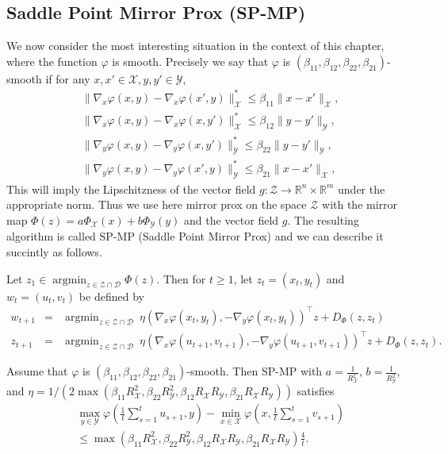 \documentclass[openany]{now}
\renewcommand{\phi}{\varphi}
\newcommand{\R}{\mathbb{R}}
\newcommand{\cZ}{\mathcal{Z}}
\newcommand{\cX}{\mathcal{X}}
\newcommand{\cY}{\mathcal{Y}}
\newcommand{\cD}{\mathcal{D}}
\newcommand{\argmin}{\mathop{\mathrm{argmin}}}
\begin{document}
\subsection{Saddle Point Mirror Prox (SP-MP)}
We now consider the most interesting situation in the context of this chapter, where the function $\phi$ is smooth. Precisely we say that $\phi$ is $(\beta_{11}, \beta_{12}, \beta_{22}, \beta_{21})$-smooth if for any $x, x' \in \cX, y, y' \in \cY$, 
\begin{align*}
& \|\nabla_x \phi(x,y) - \nabla_x \phi(x',y) \|_{\mathcal{X}}^* \leq \beta_{11} \|x-x'\|_{\mathcal{X}} , \\
& \|\nabla_x \phi(x,y) - \nabla_x \phi(x,y') \|_{\mathcal{X}}^* \leq \beta_{12} \|y-y'\|_{\mathcal{Y}} , \\
& \|\nabla_y \phi(x,y) - \nabla_y \phi(x,y') \|_{\mathcal{Y}}^* \leq \beta_{22} \|y-y'\|_{\mathcal{Y}} , \\
& \|\nabla_y \phi(x,y) - \nabla_y \phi(x',y) \|_{\mathcal{Y}}^* \leq \beta_{21} \|x-x'\|_{\mathcal{X}} ,
\end{align*}
This will imply the Lipschitzness of the vector field $g : \cZ \rightarrow \R^n \times \R^m$ under the appropriate norm. Thus we use here mirror prox on the space $\cZ$ with the mirror map $\Phi(z) = a \Phi_{\cX}(x) + b \Phi_{\cY}(y)$ and the vector field $g$. The resulting algorithm is called SP-MP (Saddle Point Mirror Prox) and we can describe it succintly as follows.

Let $z_1 \in \argmin_{z \in \cZ \cap \cD} \Phi(z)$. Then for $t \geq 1$, let $z_t=(x_t,y_t)$ and $w_t=(u_t, v_t)$ be defined by
\begin{eqnarray*}
w_{t+1} & = & \argmin_{z \in \cZ \cap \cD} \ \eta (\nabla_x \phi(x_t, y_t), - \nabla_y \phi(x_t,y_t))^{\top} z + D_{\Phi}(z,z_t) \\
z_{t+1} & = & \argmin_{z \in \cZ \cap \cD} \ \eta (\nabla_x \phi(u_{t+1}, v_{t+1}), - \nabla_y \phi(u_{t+1},v_{t+1}))^{\top} z + D_{\Phi}(z,z_t) .
\end{eqnarray*}

\begin{theorem} \label{th:spmp}
Assume that $\phi$ is $(\beta_{11}, \beta_{12}, \beta_{22}, \beta_{21})$-smooth. Then SP-MP with $a= \frac{1}{R_{\cX}^2}$, $b=\frac{1}{R_{\cY}^2}$, and 
$\eta= 1 / \left(2 \max \left(\beta_{11} R^2_{\cX}, \beta_{22} R^2_{\cY}, \beta_{12} R_{\cX} R_{\cY}, \beta_{21} R_{\cX} R_{\cY}\right) \right)$
satisfies
\begin{align*}
& \max_{y \in \mathcal{Y}} \phi\left( \frac1{t} \sum_{s=1}^t u_{s+1},y \right) - \min_{x \in \mathcal{X}} \phi\left(x, \frac1{t} \sum_{s=1}^t v_{s+1} \right) \\
& \leq \max \left(\beta_{11} R^2_{\cX}, \beta_{22} R^2_{\cY}, \beta_{12} R_{\cX} R_{\cY}, \beta_{21} R_{\cX} R_{\cY}\right) \frac{4}{t} .
\end{align*}
\end{theorem}
\end{document}
